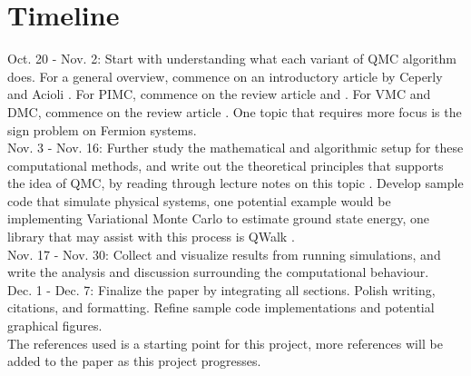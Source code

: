 \documentclass[11pt]{article}
\begin{document}
\section{Timeline}
Oct. 20 - Nov. 2: Start with understanding what each variant of QMC algorithm does. For a general overview, commence on an introductory article by Ceperly \cite{ceperly_10} and Acioli \cite{acioli_97}. For PIMC, commence on the review article \cite{troyer_wiese_05} and \cite{ceperly_95}. For VMC and DMC, commence on the review article \cite{foulkes_mitas_needs_rajagopal_01}. One topic that requires more focus is the sign problem on Fermion systems. \\
Nov. 3 - Nov. 16: Further study the mathematical and algorithmic setup for these computational methods, and write out the theoretical principles that supports the idea of QMC, by reading through lecture notes on this topic \cite{troyer_11}. Develop sample code that simulate physical systems, one potential example would be implementing Variational Monte Carlo to estimate ground state energy, one library that may assist with this process is QWalk \cite{wagner_bajdich_mitas_09}. \\
Nov. 17 - Nov. 30: Collect and visualize results from running simulations, and write the analysis and discussion surrounding the computational behaviour. \\
Dec. 1 - Dec. 7: Finalize the paper by integrating all sections. Polish writing, citations, and formatting. Refine sample code implementations and potential graphical figures. \\
The references used is a starting point for this project, more references will be added to the paper as this project progresses.





\end{document}

